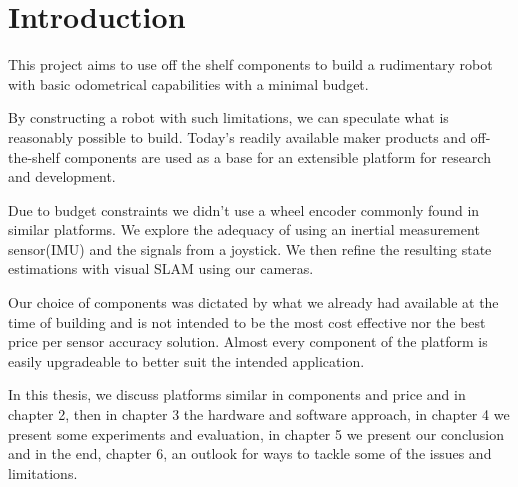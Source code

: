 \documentclass[class=report, crop=false]{standalone}
\begin{document}
\chapter{Introduction}\label{cha:introduction}

This project aims to use off the shelf components to build a rudimentary robot with basic odometrical capabilities with a minimal budget.

By constructing a robot with such limitations, we can speculate what is reasonably possible to build. Today's readily available maker products and off-the-shelf components are used as a base for an extensible platform for research and development.

Due to budget constraints we didn't use a wheel encoder commonly found in similar platforms. We explore the adequacy of using an inertial measurement sensor(IMU) and the signals from a joystick. We then refine the resulting state estimations with visual SLAM using our cameras.

Our choice of components was dictated by what we already had available at the time of building and is not intended to be the most cost effective nor the best price per sensor accuracy solution. Almost every component of the platform is  easily upgradeable to better suit the intended application.

In this thesis, we discuss platforms similar in components and price and in chapter 2, then in chapter 3 the hardware and software approach, in chapter 4 we present some experiments and evaluation, in chapter 5 we present our conclusion and in the end, chapter 6, an outlook for ways to tackle some of the issues and limitations.
\end{document}
